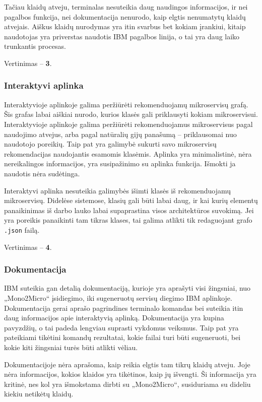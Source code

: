 \documentclass{VUMIFPSbakalaurinis}
\begin{document}
Tačiau klaidų atveju, terminalas nesuteikia daug naudingos informacijos, ir nei pagalbos funkcija, nei dokumentacija nenurodo, kaip elgtis nenumatytų klaidų atvejais. Aiškus klaidų nurodymas yra itin svarbus bet kokiam įrankiui, kitaip naudotojas yra priverstas naudotis IBM pagalbos linija, o tai yra daug laiko trunkantis procesas.

Vertinimas -- \textbf{3}.

\subsubsection{Interaktyvi aplinka}
Interaktyvioje aplinkoje galima peržiūrėti rekomenduojamų mikroservisų grafą. Šis grafas labai aiškiai nurodo, kurios klasės gali priklausyti kokiam mikroservisui. Interaktyvioje aplinkoje galima peržiūrėti rekomenduojamus mikroservisus pagal naudojimo atvejus, arba pagal natūralių gijų panašumą -- priklausomai nuo naudotojo poreikių. Taip pat yra galimybė sukurti savo mikroservisų rekomendacijas naudojantis esamomis klasėmis. Aplinka yra minimalistinė, nėra nereikalingos informacijos, yra susipažinimo su aplinka funkcija. Išmokti ja naudotis nėra sudėtinga.

Interaktyvi aplinka nesuteikia galimybės išimti klasės iš rekomenduojamų mikroservisų. Didelėse sistemose, klasių gali būti labai daug, ir kai kurių elementų panaikinimas iš darbo lauko labai supaprastina visos architektūros suvokimą. Jei yra poreikis panaikinti tam tikras klases, tai galima atlikti tik redaguojant grafo \verb|.json| failą.

Vertinimas -- \textbf{4}.

\subsubsection{Dokumentacija}
IBM suteikia gan detalią dokumentaciją, kurioje yra aprašyti visi žingsniai, nuo „Mono2Micro“ įsidiegimo, iki sugeneruotų servisų diegimo IBM aplinkoje. Dokumentacija gerai aprašo pagrindines terminalo komandas bei suteikia itin daug informacijos apie interaktyvią aplinką. Dokumentacija yra kupina pavyzdžių, o tai padeda lengviau suprasti vykdomus veiksmus. Taip pat yra pateikiami tikėtini komandų rezultatai, kokie failai turi būti sugeneruoti, bei kokie kiti žingsniai turės būti atlikti vėliau.

Dokumentacijoje nėra aprašoma, kaip reikia elgtis tam tikrų klaidų atveju. Joje nėra informacijos, kokios klaidos yra tikėtinos, kaip jų išvengti. Ši informacija yra kritinė, nes kol yra išmokstama dirbti su „Mono2Micro“, susiduriama su dideliu kiekiu netikėtų klaidų.
\end{document}
